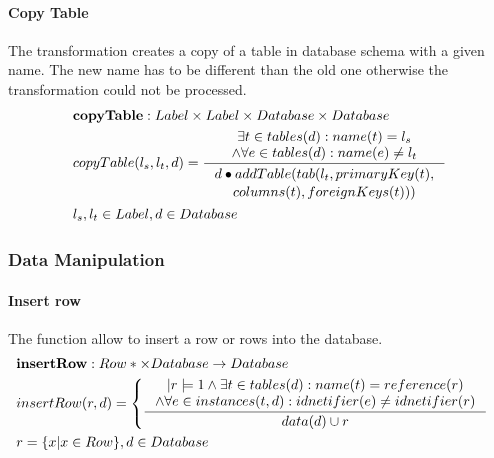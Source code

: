 \documentclass[11pt]{article}
\begin{document}
\paragraph{Copy Table} The transformation creates a copy of a table in database schema with a given name. The new name has to be different than the old one otherwise the transformation could not be processed.
\begin{align*}
&	\mathbf{copyTable} : Label \times Label \times Database \times Database \\
&	copyTable(l_s, l_t, d) = \inference{\exists t \in tables(d) : name(t) = l_s \\ \wedge \forall e \in tables(d) : name(e) \neq l_t}{\begin{gathered} d \bullet addTable(tab(l_t, primaryKey(t), \\ 
 columns(t), foreignKeys(t)))
\end{gathered}}\\
& l_s, l_t \in Label,  d \in Database
\end{align*}


\subsubsection{Data Manipulation}
\paragraph{Insert row} The function allow to insert a row or rows into the database.
\begin{align*}
&	\mathbf{insertRow} : Row* \times Database \rightarrow Database \\
&	insertRow(r, d) = \begin{cases}
		 	\inference{|r|=1 \wedge \exists t \in tables(d) : name(t) = reference(r) \\ \wedge \forall e \in instances(t, d) : idnetifier(e) \neq idnetifier(r)}{data(d) \cup r} 
		 \end{cases}	\\
&		 r = \{ x | x \in Row\},d \in Database
\end{align*}
\end{document}
